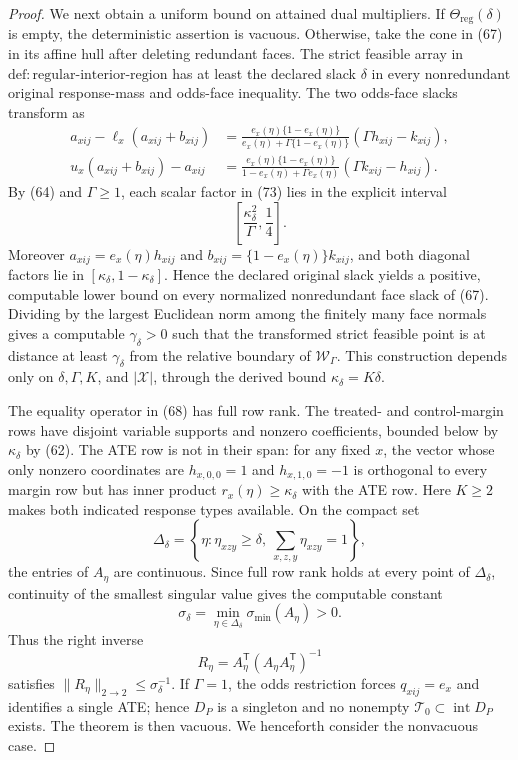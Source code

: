 \documentclass{article}
\begin{document}
\begin{proof}
We next obtain a uniform bound on attained dual multipliers.  If \(\Theta_{\mathrm{reg}}(\delta)\) is empty, the deterministic assertion is vacuous.  Otherwise, take the cone in (67) in its affine hull after deleting redundant faces.  The strict feasible array in \(\mathrm{def{:}regular\mbox{-}interior\mbox{-}region}\) has at least the declared slack \(\delta\) in every nonredundant original response-mass and odds-face inequality.  The two odds-face slacks transform as
\[
\begin{aligned}
a_{xij}-\ell_x(a_{xij}+b_{xij})
&=\frac{e_x(\eta)\{1-e_x(\eta)\}}
{e_x(\eta)+\Gamma\{1-e_x(\eta)\}}
(\Gamma h_{xij}-k_{xij}),\\
u_x(a_{xij}+b_{xij})-a_{xij}
&=\frac{e_x(\eta)\{1-e_x(\eta)\}}
{1-e_x(\eta)+\Gamma e_x(\eta)}
(\Gamma k_{xij}-h_{xij}).
\end{aligned}
\tag{73}
\]
By (64) and \(\Gamma\geq1\), each scalar factor in (73) lies in the explicit interval
\[
\left[\frac{\kappa_\delta^2}{\Gamma},\frac14\right].
\tag{74}
\]
Moreover \(a_{xij}=e_x(\eta)h_{xij}\) and \(b_{xij}=\{1-e_x(\eta)\}k_{xij}\), and both diagonal factors lie in \([\kappa_\delta,1-\kappa_\delta]\).  Hence the declared original slack yields a positive, computable lower bound on every normalized nonredundant face slack of (67).  Dividing by the largest Euclidean norm among the finitely many face normals gives a computable \(\gamma_\delta>0\) such that the transformed strict feasible point is at distance at least \(\gamma_\delta\) from the relative boundary of \(\mathcal W_\Gamma\).  This construction depends only on \(\delta,\Gamma,K\), and \(|\mathcal X|\), through the derived bound \(\kappa_\delta=K\delta\).

The equality operator in (68) has full row rank.  The treated- and control-margin rows have disjoint variable supports and nonzero coefficients, bounded below by \(\kappa_\delta\) by (62).  The ATE row is not in their span: for any fixed \(x\), the vector whose only nonzero coordinates are \(h_{x,0,0}=1\) and \(h_{x,1,0}=-1\) is orthogonal to every margin row but has inner product \(r_x(\eta)\geq\kappa_\delta\) with the ATE row.  Here \(K\geq2\) makes both indicated response types available.  On the compact set
\[
\Delta_\delta
=\left\{\eta:\eta_{xzy}\geq\delta,
\ \sum_{x,z,y}\eta_{xzy}=1\right\},
\tag{75}
\]
the entries of \(A_\eta\) are continuous.  Since full row rank holds at every point of \(\Delta_\delta\), continuity of the smallest singular value gives the computable constant
\[
\sigma_\delta
=\min_{\eta\in\Delta_\delta}\sigma_{\min}(A_\eta)>0.
\tag{76}
\]
Thus the right inverse
\[
R_\eta=A_\eta^{\mathsf T}(A_\eta A_\eta^{\mathsf T})^{-1}
\tag{77}
\]
satisfies \(\|R_\eta\|_{2\to2}\leq\sigma_\delta^{-1}\).  If \(\Gamma=1\), the odds restriction forces \(q_{xij}=e_x\) and identifies a single ATE; hence \(D_P\) is a singleton and no nonempty \(\mathcal T_0\subset\operatorname{int}D_P\) exists.  The theorem is then vacuous.  We henceforth consider the nonvacuous case.


\end{proof}
\end{document}
